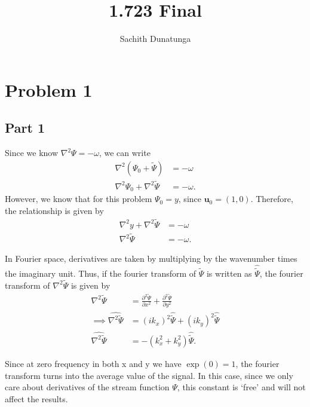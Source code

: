 \documentclass{article}
\title{1.723 Final}
\author{Sachith  Dunatunga}
\begin{document}
\newcommand{\deriv}[2]{\frac{\partial #1}{ \partial #2}}
\newcommand{\nderiv}[3]{\frac{\partial^{#3} #1}{ \partial #2^{#3}}}
\newcommand{\dx}[1]{\deriv{#1}{x}}
\newcommand{\taylorexpf}[3]{#1_{#2} + \left(#3 \right) \dx{#1}\biggr\rvert_{#2} + \frac{1}{2}\left(#3 \right)^2 \nderiv{#1}{x}{2}\biggr\rvert_{#2} + \frac{1}{6}\left(#3 \right)^3\nderiv{#1}{x}{3}\biggr\rvert_{#2} + \frac{1}{24}\left(#3 \right)^4\nderiv{#1}{x}{4}\biggr\rvert_{#2} + O(h^5)}
\maketitle

\section{Problem 1}
\subsection{Part 1}
Since we know $\nabla^2 \Psi = - \omega$, we can write
\begin{align}
    \nabla^2 (\Psi_0 + \tilde{\Psi}) &= -\omega \\
    \nabla^2 \Psi_0 + \nabla^2 \tilde{\Psi} &= -\omega.
\end{align}
However, we know that for this problem $\Psi_0 = y$, since $\mathbf{u}_0 = (1, 0)$.
Therefore, the relationship is given by
\begin{align}
    \nabla^2 y + \nabla^2 \tilde{\Psi} &= -\omega \\
    \nabla^2 \tilde{\Psi} &= -\omega.
\end{align}

In Fourier space, derivatives are taken by multiplying by the wavenumber times the imaginary unit.
Thus, if the fourier transform of $\tilde{\Psi}$ is written as $\hat{\tilde{\Psi}}$, the fourier transform of $\nabla^2 \tilde{\Psi}$ is given by
\begin{align}
    \nabla^2 \tilde{\Psi} &= \nderiv{\tilde{\Psi}}{x}{2} + \nderiv{\tilde{\Psi}}{y}{2} \\
\implies \widehat{\nabla^2 \tilde{\Psi}} &= (ik_x)^2 \hat{\tilde{\Psi}} + (ik_y)^2 \hat{\tilde{\Psi}}\\
    \widehat{\nabla^2 \tilde{\Psi}} &= -(k^2_x + k^2_y) \hat{\tilde{\Psi}}.
\end{align}

Since at zero frequency in both x and y we have $\exp(0) = 1$, the fourier transform turns into the average value of the signal.
In this case, since we only care about derivatives of the stream function $\Psi$, this constant is `free' and will not affect the results.
\end{document}
